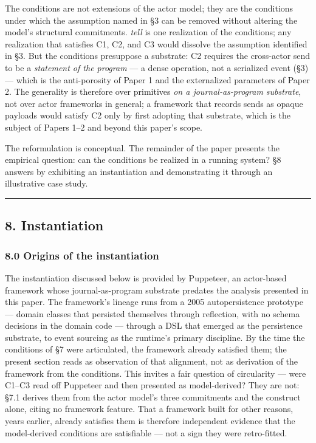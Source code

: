 \documentclass[
]{article}
\begin{document}
The conditions are not extensions of the actor model; they are the
conditions under which the assumption named in §3 can be removed without
altering the model's structural commitments. \emph{tell} is one
realization of the conditions; any realization that satisfies C1, C2,
and C3 would dissolve the assumption identified in §3. But the
conditions presuppose a substrate: C2 requires the cross-actor send to
be a \emph{statement of the program} --- a dense operation, not a
serialized event (§3) --- which is the anti-porosity of Paper 1 and the
externalized parameters of Paper 2. The generality is therefore over
primitives \emph{on a journal-as-program substrate}, not over actor
frameworks in general; a framework that records sends as opaque payloads
would satisfy C2 only by first adopting that substrate, which is the
subject of Papers 1--2 and beyond this paper's scope.

The reformulation is conceptual. The remainder of the paper presents the
empirical question: can the conditions be realized in a running system?
§8 answers by exhibiting an instantiation and demonstrating it through
an illustrative case study.

\begin{center}\rule{0.5\linewidth}{0.5pt}\end{center}

\subsection{8. Instantiation}\label{instantiation}

\subsubsection{8.0 Origins of the
instantiation}\label{origins-of-the-instantiation}

The instantiation discussed below is provided by Puppeteer, an
actor-based framework whose journal-as-program substrate predates the
analysis presented in this paper. The framework's lineage runs from a
2005 autopersistence prototype --- domain classes that persisted
themselves through reflection, with no schema decisions in the domain
code --- through a DSL that emerged as the persistence substrate, to
event sourcing as the runtime's primary discipline. By the time the
conditions of §7 were articulated, the framework already satisfied them;
the present section reads as observation of that alignment, not as
derivation of the framework from the conditions. This invites a fair
question of circularity --- were C1--C3 read off Puppeteer and then
presented as model-derived? They are not: §7.1 derives them from the
actor model's three commitments and the construct alone, citing no
framework feature. That a framework built for other reasons, years
earlier, already satisfies them is therefore independent evidence that
the model-derived conditions are satisfiable --- not a sign they were
retro-fitted.
\end{document}

